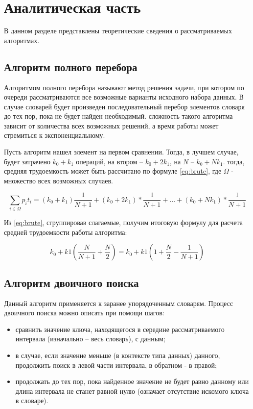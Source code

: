\chapter{Аналитическая часть}

В данном разделе представлены теоретические сведения о рассматриваемых алгоритмах.

\section{Алгоритм полного перебора}

Алгоритмом полного перебора называют метод решения задачи, при котором по очереди рассматриваются все возможные варианты исходного набора данных. В случае словарей будет произведен последовательный перебор элементов словаря до тех пор, пока не будет найден необходимый. сложность такого алгоритма зависит от количества всех возможных решений, а время работы может стремиться к экспоненциальному.

Пусть алгоритм нашел элемент на первом сравнении. Тогда, в лучшем случае, будет затрачено $k_0 + k_1$ операций, на втором -- $k_0 + 2k_1$, на $N$ -- $k_0 + Nk_1$. тогда, средняя трудоемкость может быть рассчитано по формуле \eqref{eq:brute}, где $\Omega$ - множество всех возможных случаев.

\begin{equation}
   \label{eq:brute}
   \sum_{i \in \Omega} p_i t_i = (k_0 + k_1) \frac{1}{N + 1} + (k_0 + 2k_1) * \frac{1}{N + 1} + \dots + (k_0 + Nk_1) * \frac{1}{N + 1} 
\end{equation}

Из \eqref{eq:brute}, сгруппировав слагаемые, получим итоговую формулу для расчета средней трудоемкости работы алгоритма:

\begin{equation}
   k_0 + k1(\frac{N}{N + 1} + \frac{N}{2}) = k_0 + k1(1 + \frac{N}{2} - \frac{1}{N + 1}) 
\end{equation}

\section{Алгоритм двоичного поиска}

Данный алгоритм применяется к заранее упорядоченным словарям. Процесс двоичного поиска можно описать при помощи шагов:
\begin{itemize}
    \item сравнить значение ключа, находящегося в середине рассматриваемого интервала (изначально -- весь словарь), с данным;
    \item в случае, если значение меньше (в контексте типа данных) данного, продолжить поиск в левой части интервала, в обратном - в правой;
    \item продолжать до тех пор, пока найденное значение не будет равно данному или длина интервала не станет равной нулю (означает отсутствие искомого ключа в словаре).
\end{itemize}


